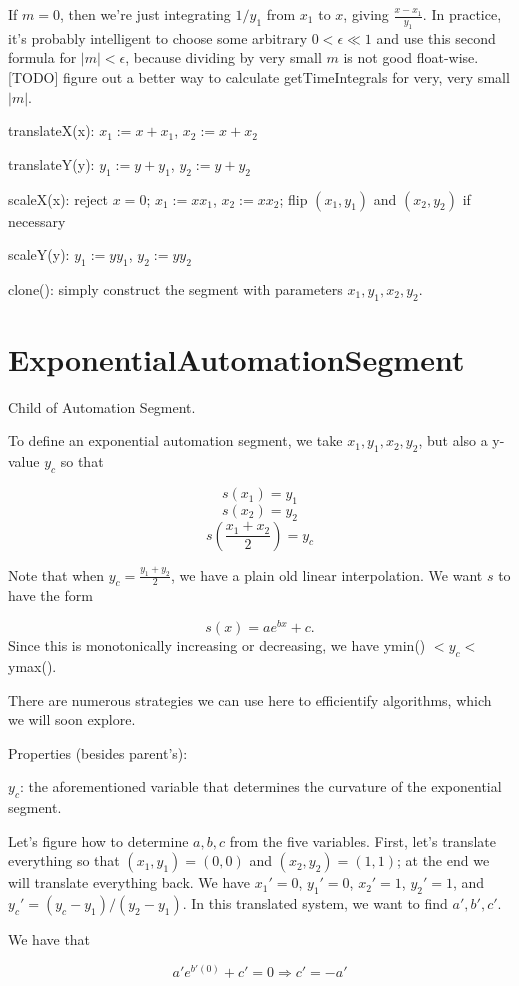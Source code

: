 \documentclass{article}
\begin{document}
If $m=0$, then we're just integrating $1/y_1$ from $x_1$ to $x$, giving $\frac{x-x_1}{y_1}$. In practice, it's probably intelligent to choose some arbitrary $0<\epsilon\ll 1$ and use this second formula for $|m| < \epsilon$, because dividing by very small $m$ is not good float-wise. [TODO] figure out a better way to calculate getTimeIntegrals for very, very small $|m|$.

translateX(x): $x_1:=x+x_1$, $x_2:=x+x_2$

translateY(y): $y_1:=y+y_1$, $y_2:=y+y_2$

scaleX(x): reject $x=0$; $x_1:=xx_1$, $x_2:=xx_2$; flip $(x_1, y_1)$ and $(x_2, y_2)$ if necessary

scaleY(y): $y_1:=yy_1$, $y_2:=yy_2$

clone(): simply construct the segment with parameters $x_1, y_1, x_2, y_2$.

\section{ExponentialAutomationSegment}

Child of Automation Segment.

To define an exponential automation segment, we take $x_1, y_1, x_2, y_2$, but also a y-value $y_c$ so that

$$s(x_1)=y_1$$
$$s(x_2)=y_2$$
$$s\left(\frac{x_1+x_2}{2}\right) = y_c$$

Note that when $y_c = \frac{y_1+y_2}{2}$, we have a plain old linear interpolation. We want $s$ to have the form

$$s(x) = ae^{bx}+c.$$ Since this is monotonically increasing or decreasing, we have ymin() $< y_c <$ ymax().

There are numerous strategies we can use here to efficientify algorithms, which we will soon explore.

Properties (besides parent's):

$y_c$: the aforementioned variable that determines the curvature of the exponential segment.

Let's figure how to determine $a,b,c$ from the five variables. First, let's translate everything so that $(x_1,y_1)=(0,0)$ and $(x_2, y_2)=(1,1)$; at the end we will translate everything back. We have $x_1'=0$, $y_1'=0$, $x_2'=1$, $y_2'=1$, and $y_c'=(y_c-y_1)/(y_2-y_1)$. In this translated system, we want to find $a',b',c'$.

We have that

$$a'e^{b'(0)}+c'=0\Longrightarrow c'=-a'$$
\end{document}
